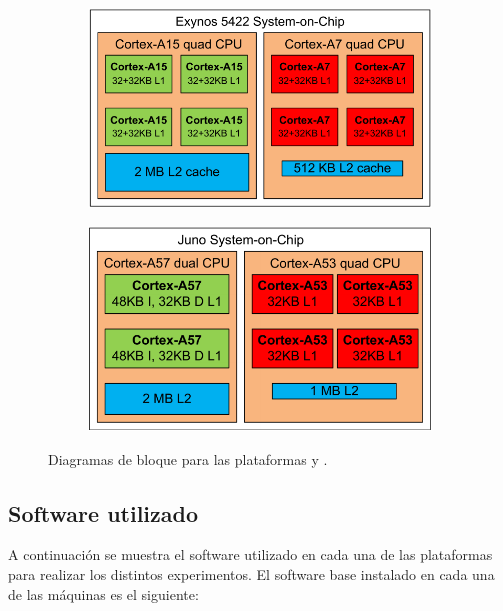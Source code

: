\begin{figure}[t]
  \centering
    \begin{subfigure}[t]{0.45\textwidth}
      \centering
      \includegraphics[width=1\linewidth]{Figures/Exynos-2.pdf}
      \caption{\odroid}
      \label{fig:diagrama-bloques:odroid}
    \end{subfigure}
    \begin{subfigure}[t]{0.44\textwidth}
      \centering
      \includegraphics[width=1\linewidth]{Figures/Juno.pdf}
      \caption{\juno}
      \label{fig:diagrama-bloques:juno}
    \end{subfigure}  
  \caption{Diagramas de bloque para las plataformas \juno y \odroid.}
  \label{fig:diagrama-bloques}
\end{figure}



\subsection{Software utilizado}
A continuación se muestra el software utilizado en cada una de las
plataformas para realizar los distintos experimentos. El software base
instalado en cada una de las máquinas es el siguiente:

